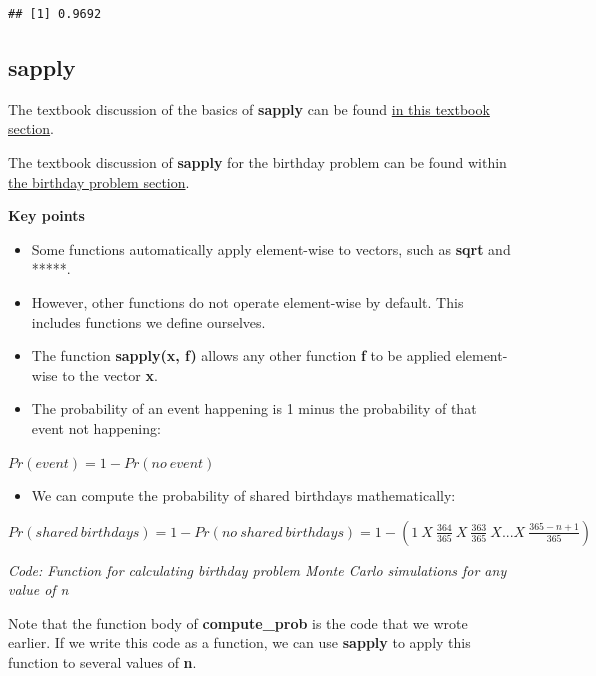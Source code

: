 \documentclass[
]{article}
\providecommand{\tightlist}{%
  \setlength{\itemsep}{0pt}\setlength{\parskip}{0pt}}
\begin{document}
\begin{verbatim}
## [1] 0.9692
\end{verbatim}

\hypertarget{sapply}{%
\subsection{sapply}\label{sapply}}

The textbook discussion of the basics of \textbf{sapply} can be found
\href{https://rafalab.github.io/dsbook/programming-basics.html\#vectorization}{in
this textbook section}.

The textbook discussion of \textbf{sapply} for the birthday problem can
be found within
\href{https://rafalab.github.io/dsbook/probability.html\#birthday-problem}{the
birthday problem section}.

\textbf{Key points}

\begin{itemize}
\tightlist
\item
  Some functions automatically apply element-wise to vectors, such as
  \textbf{sqrt} and *****.
\item
  However, other functions do not operate element-wise by default. This
  includes functions we define ourselves.
\item
  The function \textbf{sapply(x, f)} allows any other function
  \textbf{f} to be applied element-wise to the vector \textbf{x}.
\item
  The probability of an event happening is 1 minus the probability of
  that event not happening:
\end{itemize}

\(Pr(event) = 1 - Pr(no\:event)\)

\begin{itemize}
\tightlist
\item
  We can compute the probability of shared birthdays mathematically:
\end{itemize}

\(Pr(shared\:birthdays) = 1 − Pr(no\:shared\:birthdays) = 1 − (1\:X\: \frac{364}{365}\:X \:\frac{363}{365}\:X...X\: \frac{365−n+1}{365})\)

\emph{Code: Function for calculating birthday problem Monte Carlo
simulations for any value of n}

Note that the function body of \textbf{compute\_prob} is the code that
we wrote earlier. If we write this code as a function, we can use
\textbf{sapply} to apply this function to several values of \textbf{n}.
\end{document}
